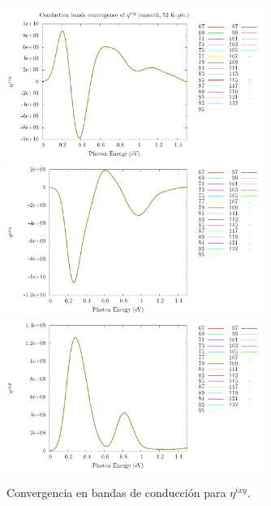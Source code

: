 \documentclass[11pt]{article}
\begin{document}
\begin{figure}
	\begin{center}
		\includegraphics[width=0.75\textwidth]{./figures/12.5/res3_eta2_1_sm_NCconv.pdf}\\
		\includegraphics[width=0.75\textwidth]{./figures/12.5/res3_eta2_2_sm_NCconv.pdf}\\
		\includegraphics[width=0.75\textwidth]{./figures/12.5/res3_eta2_3_sm_NCconv.pdf}
	\end{center}
	\caption{Convergencia en bandas de conducci\'on para $\eta^{ixy}$.}
	\label{fig:eta_12.5}
\end{figure}
\end{document}
